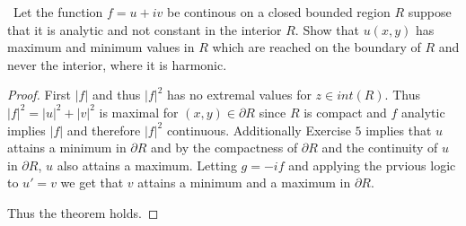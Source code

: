 \documentclass[11pt]{amsart}
\theoremstyle{definition}
\numberwithin{theorem}{section}
\numberwithin{definition}{section}
\numberwithin{equation}{section}
\begin{document}
 \medskip {}\ Let the function $f = u + iv$ be continous on a closed bounded region $R$ suppose that it is analytic and not constant in the interior $R$. Show that $u(x,y)$ has maximum and minimum values in $R$ which are reached on the boundary of $R$ and never the interior, where it is harmonic.
 \begin{proof}
 	First $|f|$ and thus $|f|^2$ has no extremal values for $z \in int(R)$. Thus $|f|^2 = |u|^2 + |v|^2$ is maximal for $(x,y) \in \partial R$ since $R$ is compact and $f$ analytic implies $|f|$ and therefore $|f|^2$ continuous. Additionally Exercise $5$ implies that $u$ attains a minimum in $\partial R$ and by the compactness of $\partial R$ and the continuity of $u$ in $\partial R$, $u$ also attains a maximum. Letting $g = -if$ and applying the prvious logic to $u' = v$ we get that $v$ attains a minimum and a maximum in $\partial R$.

 	Thus the theorem holds.
 \end{proof}
\end{document}
